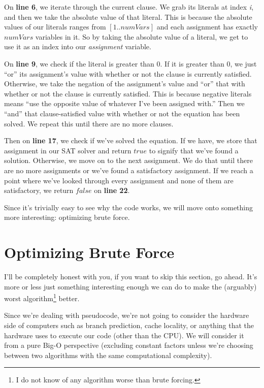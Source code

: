 On \textbf{line 6}, we iterate through the current clause. We grab its literals at 
index \textit{i}, and then we take the absolute value of that literal. This is because 
the absolute values of our literals ranges from $[1..numVars]$ and each assignment has 
exactly $numVars$ variables in it. So by taking the absolute value of a literal, we 
get to use it as an index into our \textit{assignment} variable.

On \textbf{line 9}, we check if the literal is greater than 0. If it is greater than 
0, we just ``or'' its assignment's value with whether or not the clause is currently 
satisfied. Otherwise, we take the negation of the assignment's value and ``or'' that 
with whether or not the clause is currently satisfied. This is because negative literals 
means ``use the opposite value of whatever I've been assigned with.'' Then we 
``and'' that clause-satisfied value with whether or not the equation has been solved.
We repeat this until there are no more clauses.

Then on \textbf{line 17}, we check if we've solved the equation. If we have, we 
store that assignment in our SAT solver and return $true$ to signify that we've found 
a solution. Otherwise, we move on to the next assignment. We do that until there are no
more assignments or we've found a satisfactory assignment. If we reach a point where 
we've looked through every assignment and none of them are satisfactory, we return 
$false$ on \textbf{line 22}.

Since it's trivially easy to see why the code works, we will move onto something
more interesting: optimizing brute force.

\section{Optimizing Brute Force}

I'll be completely honest with you, if you want to skip this section, go ahead.
It's more or less just something interesting enough we can do to make the
(arguably) worst algorithm\footnote{I do not know of any algorithm worse than
brute forcing.} better.

Since we're dealing with pseudocode, we're not going to consider the hardware
side of computers such as branch prediction, cache locality, or anything that
the hardware uses to execute our code (other than the CPU). We will consider
it from a pure Big-O perspective (excluding constant factors unless we're
choosing between two algorithms with the same computational complexity).

